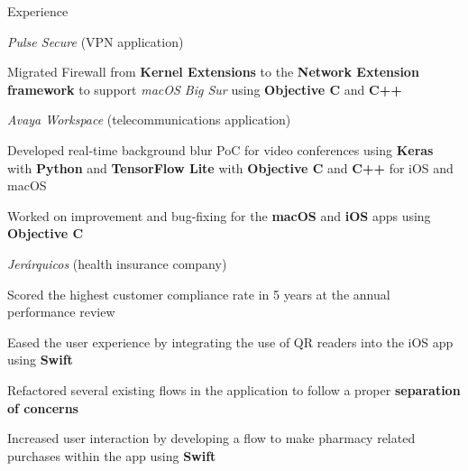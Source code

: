 \documentclass{curriculum}
\begin{document}
\begin{cvsection}{Experience}
        \begin{sectionitemlist}

        \item{\textit{Pulse Secure} (VPN application)}
            \begin{sectionitemlist}
            \item{
                Migrated Firewall from \textbf{Kernel Extensions} to the
                \textbf{Network Extension framework} to support \textit{macOS Big Sur}
                using \textbf{Objective C} and \textbf{C++}
            }
            \end{sectionitemlist}

        \item{\textit{Avaya Workspace} (telecommunications application)}
            \begin{sectionitemlist}
            \item{
                Developed real-time background blur PoC for video conferences using
                \textbf{Keras} with \textbf{Python} and \textbf{TensorFlow Lite}
                with \textbf{Objective C} and \textbf{C++} for iOS and macOS
            }
            \item{
                Worked on improvement and bug-fixing for the \textbf{macOS}
                and \textbf{iOS} apps using \textbf{Objective C}
            }
            \end{sectionitemlist}

        \pagebreak %
        \item{\textit{Jerárquicos} (health insurance company)}
            \begin{sectionitemlist}
            \item{
                Scored the highest customer compliance rate
                in 5 years at the annual performance review
            }
            \item{
                Eased the user experience by integrating the use of
                QR readers into the iOS app using \textbf{Swift}
            }
            \item{
                Refactored several existing flows in the application
                to follow a proper \textbf{separation of concerns}
            }
            \item {
                Increased user interaction by developing a flow to make pharmacy
                related purchases within the app using \textbf{Swift}
            }
            \end{sectionitemlist}


\end{sectionitemlist}
\end{cvsection}
\end{document}
